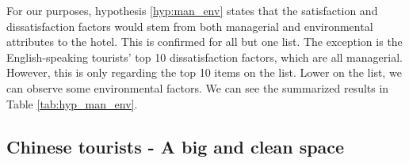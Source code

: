 \documentclass[smallextended,natbib]{svjour3}       %
\begin{document}
    For our purposes, hypothesis \ref{hyp:man_env} states that the satisfaction and dissatisfaction factors would stem from both managerial and environmental attributes to the hotel. This is confirmed for all but one list. The exception is the English-speaking tourists' top 10 dissatisfaction factors, which are all managerial. However, this is only regarding the top 10 items on the list. Lower on the list, we can observe some environmental factors. We can see the summarized results in Table \ref{tab:hyp_man_env}. 


    \begin{table}[h]
    \caption{Managerial and Environmental nature of the 10 most frequent keywords}
    \label{tab:hyp_man_env}
    \end{table}

  \subsection{Chinese tourists - A big and clean space}\label{disc:zh}
\end{document}
